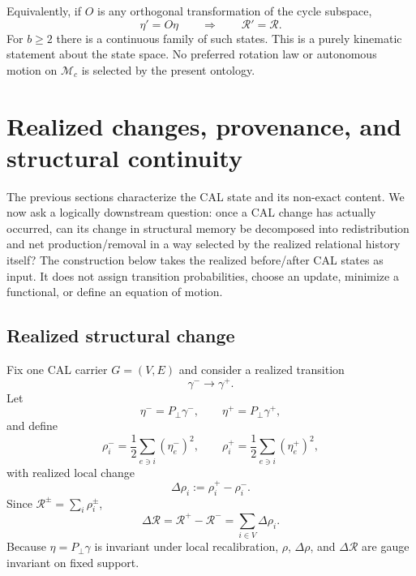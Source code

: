 \documentclass[aip,jmp,amsmath,amssymb,reprint]{revtex4-2}
\newcommand{\Rcal}{\mathcal{R}}
\begin{document}
Equivalently, if $O$ is any orthogonal transformation of the cycle subspace,
\begin{equation}
\eta' = O\eta
\qquad\Longrightarrow\qquad
\Rcal'=\Rcal.
\label{eq:orthogonal-memory}
\end{equation}
For $b\ge2$ there is a continuous family of such states. This is a purely kinematic statement about the state space. No preferred rotation law or autonomous motion on $\mathcal M_c$ is selected by the present ontology.

\section{Realized changes, provenance, and structural continuity}\label{sec:balance}

The previous sections characterize the CAL state and its non-exact content. We now ask a logically downstream question: once a CAL change has actually occurred, can its change in structural memory be decomposed into redistribution and net production/removal in a way selected by the realized relational history itself? The construction below takes the realized before/after CAL states as input. It does not assign transition probabilities, choose an update, minimize a functional, or define an equation of motion.

\subsection{Realized structural change}

Fix one CAL carrier $G=(V,E)$ and consider a realized transition
\begin{equation}
\gamma^-\longrightarrow\gamma^+.
\end{equation}
Let
\begin{equation}
\eta^- = P_\perp\gamma^- ,
\qquad
\eta^+ = P_\perp\gamma^+ ,
\end{equation}
and define
\begin{equation}
\rho_i^- = \frac12\sum_{e\ni i}(\eta_e^-)^2,
\qquad
\rho_i^+ = \frac12\sum_{e\ni i}(\eta_e^+)^2,
\end{equation}
with realized local change
\begin{equation}
\Delta\rho_i:=\rho_i^+-\rho_i^-.
\label{eq:delta-rho-def}
\end{equation}
Since $\Rcal^{\pm}=\sum_i\rho_i^{\pm}$,
\begin{equation}
\Delta\Rcal
=\Rcal^+-\Rcal^-
=\sum_{i\in V}\Delta\rho_i.
\label{eq:delta-R-sum}
\end{equation}
Because $\eta=P_\perp\gamma$ is invariant under local recalibration, $\rho$, $\Delta\rho$, and $\Delta\Rcal$ are gauge invariant on fixed support.
\end{document}
